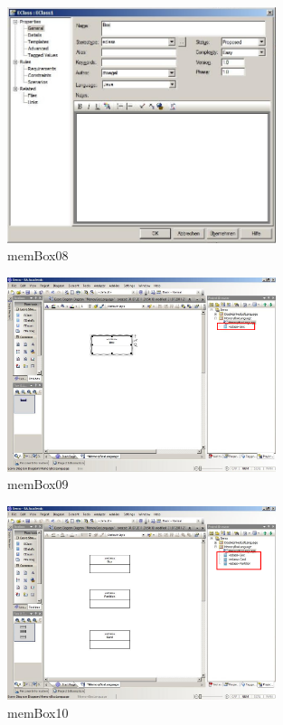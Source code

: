 \begin{figure}[!h]
	\centering
  \includegraphics[width=0.7\textwidth]{pics/memBox08.png}
	\caption{memBox08}
	\label{memBox08}
\end{figure}

\begin{figure}[!h]
	\centering
  \includegraphics[width=0.7\textwidth]{pics/memBox09.png}
	\caption{memBox09}
	\label{memBox09}
\end{figure}

\begin{figure}[!h]
	\centering
  \includegraphics[width=0.7\textwidth]{pics/memBox10.png}
	\caption{memBox10}
	\label{memBox10}
\end{figure}

